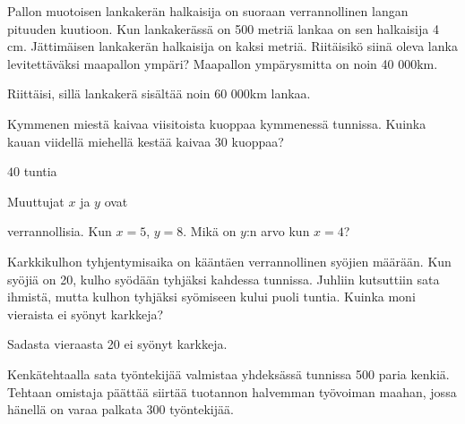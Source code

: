 \begin{tehtavasivu}
\begin{tehtava}
Pallon muotoisen lankakerän halkaisija on suoraan verrannollinen langan pituuden kuutioon. Kun lankakerässä on 500 metriä lankaa on sen halkaisija 4 cm. Jättimäisen lankakerän halkaisija on kaksi metriä. Riitäisikö siinä oleva lanka levitettäväksi maapallon ympäri? Maapallon ympärysmitta on noin 40 000km.
\begin{vastaus}
Riittäisi, sillä lankakerä sisältää noin 60 000km lankaa.
\end{vastaus}
\end{tehtava}

\begin{tehtava}
	Kymmenen miestä kaivaa viisitoista kuoppaa kymmenessä tunnissa.
	Kuinka kauan viidellä miehellä kestää kaivaa $30$ kuoppaa?	
	\begin{vastaus}
		$40$ tuntia
	\end{vastaus}
\end{tehtava}

\begin{tehtava}
	Muuttujat $x$ ja $y$ ovat
	\begin{alakohdatrivi}
	\end{alakohdatrivi}
	verrannollisia. Kun $x = 5$, $y = 8$. Mikä on $y$:n arvo kun $x = 4$?
	\begin{vastaus}
		\begin{alakohdat}
		\end{alakohdat}
	\end{vastaus}
\end{tehtava}

\begin{tehtava}
	Karkkikulhon tyhjentymisaika on kääntäen verrannollinen syöjien määrään. Kun syöjiä on 20, kulho syödään tyhjäksi kahdessa tunnissa. Juhliin kutsuttiin sata ihmistä, mutta kulhon tyhjäksi syömiseen kului puoli tuntia. Kuinka moni vieraista ei syönyt karkkeja?
	\begin{vastaus}
		Sadasta vieraasta 20 ei syönyt karkkeja.
	\end{vastaus}
\end{tehtava}

\begin{tehtava}
Kenkätehtaalla sata työntekijää valmistaa yhdeksässä tunnissa 500 paria kenkiä. Tehtaan omistaja päättää siirtää tuotannon halvemman työvoiman maahan, jossa hänellä on varaa palkata 300 työntekijää. 


\end{tehtava}
\end{tehtavasivu}
